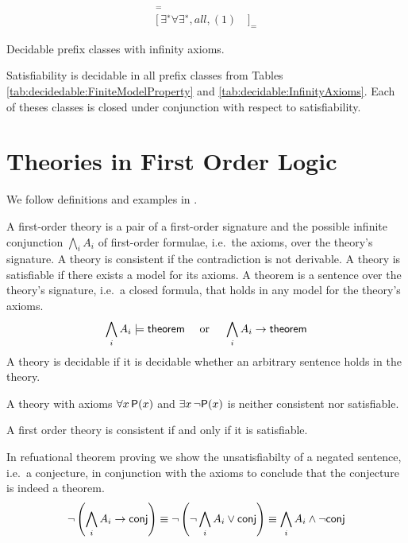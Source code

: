 \begin{table}[hbt]
	\begin{align*}
	[\,all, (\omega), (1)&\,]_{=} \tag{Rabin 1969} 
	\\
	[\,\exists^{∗}\forall\exists^{∗}, all, (1)&\,]_{=} \tag{Shelah 1977}
	\end{align*}
	\caption[Decidable prefix classes (infinite)]{Decidable prefix classes with infinity axioms. }
	\label{tab:decidable:InfinityAxioms}
\end{table}

\begin{lemma}
	Satisfiability is decidable \cite{MR1482227} in all prefix classes from Tables 
	\ref{tab:decidedable:FiniteModelProperty} and \ref{tab:decidable:InfinityAxioms}.
	Each of theses classes is closed under conjunction with respect to satisfiability.
\end{lemma}



\section{Theories in First Order Logic}\label{sec:decidable:fol:theories}

We follow definitions and examples in \cite{AM2015L}.

\begin{definition}[Theory]
	A {\myem first-order theory} is a pair of a first-order signature 
	and the possible infinite conjunction $\bigwedge_i A_i$ of first-order formulae, 
	i.e.~the axioms, over the theory's signature. 
	A theory is {\myem consistent} if the contradiction is not derivable.
	A theory is satisfiable if there exists a model for its axioms.
%	
	A {\myem theorem} is a sentence over the theory's signature, 
	i.e.~a closed formula, that holds in any model for the theory's axioms.
	\[
		\bigwedge_i A_i \models \mathsf{theorem} 
		\quad\text{ or }\quad
		\bigwedge_i A_i \rightarrow \mathsf{theorem} 
	\]
	A theory is decidable if it is decidable whether an arbitrary sentence holds in the theory.
\end{definition}

\begin{example}
A theory with axioms $\forall x\,{\mathsf P}(x)$ and $\exists x\,\lnot{\mathsf P}(x)$ is neither consistent nor satisfiable.
\end{example}

\begin{lemma}
	A first order theory is consistent if and only if it is satisfiable.
\end{lemma}
%
\begin{remark} 
In refuational theorem proving
we show the unsatisfiabilty 
of a negated sentence, 
i.e.~a {\myem conjecture},
in conjunction with the axioms
to conclude that the conjecture is indeed a theorem.
\[
	\lnot\left(\bigwedge_i A_i \rightarrow \mathsf{conj}\right) \equiv
	\lnot\left(\lnot\bigwedge_i A_i \lor \mathsf{conj}\right) \equiv
	\bigwedge_i A_i \land \lnot \mathsf{conj}
\]
\end{remark}

